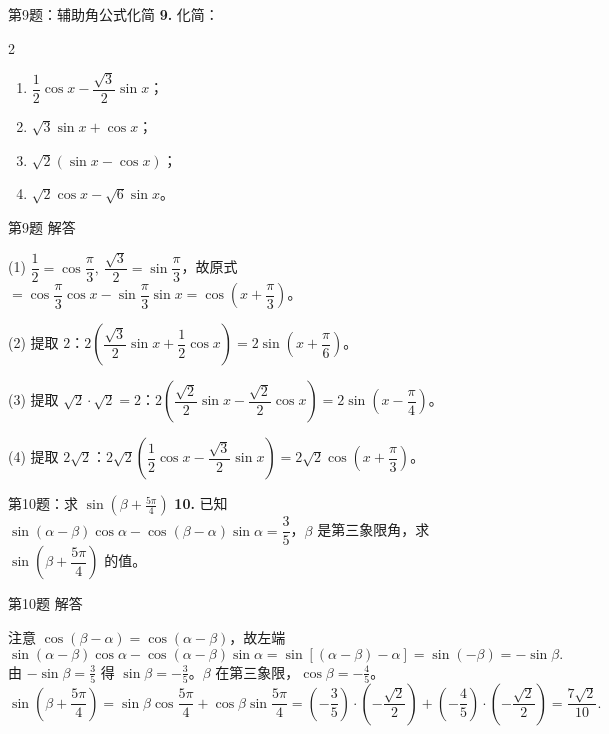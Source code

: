 \documentclass[10pt,aspectratio=169,serif]{beamer}
\begin{document}
\begin{frame}[t]{第9题：辅助角公式化简}
\textbf{9.} 化简：
\begin{multicols}{2}
\begin{enumerate}
  \item $\dfrac12\cos x-\dfrac{\sqrt3}{2}\sin x$；
  \item $\sqrt3\sin x+\cos x$；
  \item $\sqrt2(\sin x-\cos x)$；
  \item $\sqrt2\cos x-\sqrt6\sin x$。
\end{enumerate}
\end{multicols}
\end{frame}

\begin{frame}[t]{第9题 解答}
\begin{tcolorbox}[colback=orange!10,colframe=orange,title=\textbf{解（辅助角公式）}]
(1) $\dfrac12=\cos\dfrac{\pi}{3},\ \dfrac{\sqrt3}{2}=\sin\dfrac{\pi}{3}$，故原式 $=\cos\dfrac{\pi}{3}\cos x-\sin\dfrac{\pi}{3}\sin x=\cos\!\left(x+\dfrac{\pi}{3}\right)$。

(2) 提取 $2$：$2\!\left(\dfrac{\sqrt3}{2}\sin x+\dfrac12\cos x\right)=2\sin\!\left(x+\dfrac{\pi}{6}\right)$。

(3) 提取 $\sqrt2\cdot\sqrt2=2$：$2\!\left(\dfrac{\sqrt2}{2}\sin x-\dfrac{\sqrt2}{2}\cos x\right)=2\sin\!\left(x-\dfrac{\pi}{4}\right)$。

(4) 提取 $2\sqrt2$：$2\sqrt2\!\left(\dfrac12\cos x-\dfrac{\sqrt3}{2}\sin x\right)=2\sqrt2\cos\!\left(x+\dfrac{\pi}{3}\right)$。
\end{tcolorbox}
\end{frame}

\begin{frame}[t]{第10题：求 $\sin\!\left(\beta+\frac{5\pi}{4}\right)$}
\textbf{10.} 已知 $\sin(\alpha-\beta)\cos\alpha-\cos(\beta-\alpha)\sin\alpha=\dfrac35$，$\beta$ 是第三象限角，求 $\sin\!\left(\beta+\dfrac{5\pi}{4}\right)$ 的值。
\end{frame}

\begin{frame}[t]{第10题 解答}
\begin{tcolorbox}[colback=orange!10,colframe=orange,title=\textbf{解}]
注意 $\cos(\beta-\alpha)=\cos(\alpha-\beta)$，故左端
\[
\sin(\alpha-\beta)\cos\alpha-\cos(\alpha-\beta)\sin\alpha=\sin[(\alpha-\beta)-\alpha]=\sin(-\beta)=-\sin\beta.
\]
由 $-\sin\beta=\frac35$ 得 $\sin\beta=-\frac35$。$\beta$ 在第三象限，$\cos\beta=-\frac45$。
\[
\sin\!\left(\beta+\frac{5\pi}{4}\right)=\sin\beta\cos\frac{5\pi}{4}+\cos\beta\sin\frac{5\pi}{4}
=\!\left(-\frac35\right)\!\cdot\!\left(-\frac{\sqrt2}{2}\right)+\!\left(-\frac45\right)\!\cdot\!\left(-\frac{\sqrt2}{2}\right)
=\frac{7\sqrt2}{10}.
\]
\end{tcolorbox}
\end{frame}
\end{document}
